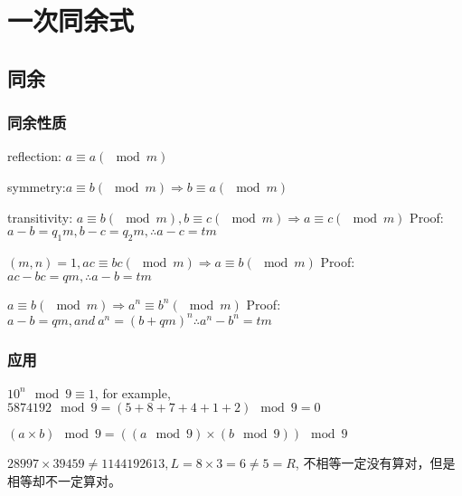\documentclass[UTF8]{../09-Mathematics}
\begin{document}
\section{一次同余式}

\subsection{同余}


\subsubsection{同余性质}

\begin{proposition}
    reflection: $a \equiv a (\mod m) $

    symmetry:$ a \equiv b (\mod m) \Rightarrow b \equiv a (\mod m)$

    transitivity:
    $a \equiv b (\mod m), b \equiv c (\mod m) \Rightarrow a \equiv c (\mod m)$
    Proof: $a-b = q_1 m, b-c = q_2 m, \therefore a-c = tm$
\end{proposition}

\begin{proposition}\label{proposition_congruence_ka}
    $(m, n) = 1, ac \equiv bc (\mod m) \Rightarrow a \equiv b (\mod m)$
    Proof: $ac-bc = q m, \therefore a-b = tm$
\end{proposition}

\begin{proposition}
    $a \equiv b (\mod m) \Rightarrow a^n \equiv b^n (\mod m)$
    Proof: $a-b = q m, and \  a^n  =(b + qm)^n   \therefore a^n-b^n = tm$
\end{proposition}


\subsubsection{应用}

\begin{proposition}
    $10^n \mod 9 \equiv 1$, for example, $5874192 \mod 9 = (5+8+7+4+1+2) \mod 9  = 0$
\end{proposition}

\begin{proposition}
    $(a \times b) \mod 9 =  ((a \mod 9 )\times (b \mod 9) ) \mod 9 $

    $28997 \times 39459  \neq 1144192613, L = 8 \times 3 = 6 \neq 5=R$, 不相等一定没有算对，但是相等却不一定算对。
\end{proposition}
\end{document}

